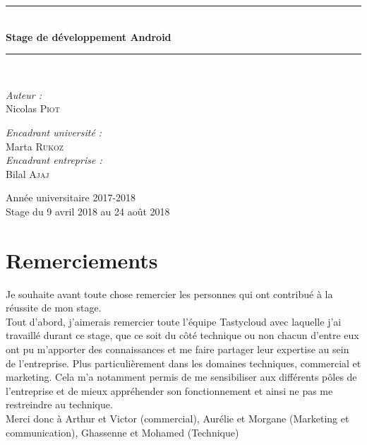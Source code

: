 \documentclass[oneside]{book}
\theoremstyle{break}
\begin{document}
\begin{titlepage}
\begin{center}
\rule{\linewidth}{0.5mm} \\[0.4cm]
{ \huge \bfseries Stage de développement Android \\[0.4cm] }
\rule{\linewidth}{0.5mm} \\[1.5cm]
\noindent
\begin{minipage}{0.4\textwidth}
  \begin{flushleft} \large
    \emph{Auteur :}\\
    Nicolas \textsc{Piot}\\
  \end{flushleft}
\end{minipage}%
\begin{minipage}{0.4\textwidth}
  \begin{flushright} \large
    \emph{Encadrant université :} \\
    Marta \textsc{Rukoz}\\
    \emph{Encadrant entreprise :} \\
    Bilal \textsc{Ajaj}\\
  \end{flushright}
\end{minipage}

\vfill

{\large Année universitaire 2017-2018 \\Stage du 9 avril 2018 au 24 août 2018}

\end{center}
\end{titlepage}



\chapter*{Remerciements}

Je souhaite avant toute chose remercier les personnes qui ont contribué à la réussite de mon stage.\\


Tout d'abord, j'aimerais remercier toute l'équipe Tastycloud avec laquelle j'ai travaillé durant ce stage, que ce soit du côté technique ou non chacun d'entre eux ont pu m'apporter des connaissances et me faire partager leur expertise au sein de l'entreprise. Plus particulièrement dans les domaines techniques, commercial et marketing. Cela m'a notamment permis de me sensibiliser aux différents pôles de l'entreprise et de mieux appréhender son fonctionnement et ainsi ne pas me restreindre au technique.\\
Merci donc à Arthur et Victor (commercial), Aurélie et Morgane (Marketing et communication), Ghassenne et Mohamed (Technique)\\
\end{document}
